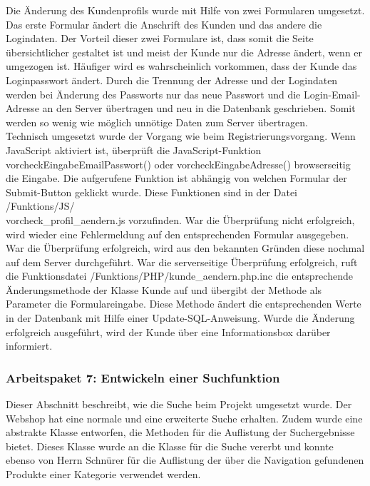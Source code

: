 Die Änderung des Kundenprofils wurde mit Hilfe von zwei Formularen umgesetzt. Das erste Formular ändert die Anschrift des Kunden und das andere die Logindaten. Der Vorteil dieser zwei Formulare ist, dass somit die Seite übersichtlicher gestaltet ist und meist der Kunde  nur die Adresse ändert, wenn er umgezogen ist. Häufiger wird es wahrscheinlich vorkommen, dass der Kunde das Loginpasswort ändert. Durch die Trennung der Adresse und der Logindaten werden bei Änderung des Passworts nur das neue Passwort und die Login-Email-Adresse an den Server übertragen und neu in die Datenbank geschrieben. Somit werden so wenig wie möglich unnötige Daten zum Server übertragen.\\
Technisch umgesetzt wurde der Vorgang wie beim Registrierungsvorgang. Wenn JavaScript aktiviert ist, überprüft die JavaScript-Funktion \glqq vorcheckEingabeEmailPasswort()\grqq{} oder \glqq vorcheckEingabeAdresse()\grqq{} browserseitig die Eingabe. Die aufgerufene Funktion ist abhängig von welchen Formular der Submit-Button geklickt wurde. Diese Funktionen sind in der Datei \glqq /Funktions/JS/ \\ vorcheck\_profil\_aendern.js\grqq{} vorzufinden. War die Überprüfung nicht erfolgreich, wird wieder eine Fehlermeldung auf den entsprechenden Formular ausgegeben. War die Überprüfung erfolgreich, wird aus den bekannten Gründen diese nochmal auf dem Server durchgeführt. War die serverseitige Überprüfung erfolgreich, ruft die Funktionsdatei \glqq /Funktions/PHP/kunde\_aendern.php.inc\grqq{} die entsprechende Änderungsmethode der Klasse \glqq Kunde\grqq{} auf und übergibt der Methode als Parameter die Formulareingabe. Diese Methode ändert die entsprechenden Werte in der Datenbank mit Hilfe einer Update-SQL-Anweisung. Wurde die Änderung erfolgreich ausgeführt, wird der Kunde über eine Informationsbox darüber informiert.

\subsubsection{Arbeitspaket 7: Entwickeln einer Suchfunktion}
Dieser Abschnitt beschreibt, wie die Suche beim Projekt umgesetzt wurde. Der Webshop hat eine \glqq normale\grqq{} und eine \glqq erweiterte\grqq{} Suche erhalten. Zudem wurde eine abstrakte Klasse entworfen, die Methoden für die Auflistung der Suchergebnisse bietet. Dieses Klasse wurde an die Klasse für die Suche vererbt und konnte ebenso von Herrn Schnürer für die Auflistung der über die Navigation gefundenen Produkte einer Kategorie verwendet werden.\\

